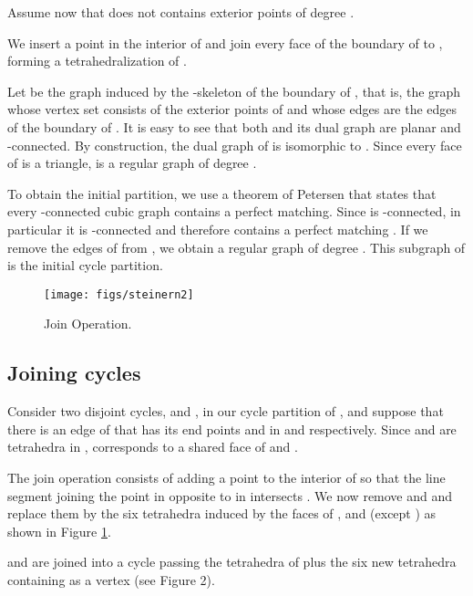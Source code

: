\documentclass{article}
\begin{document}
Assume now  that  does not contains 
exterior points of degree .\par

We insert a point  in the interior of  and join
every face of the boundary of  to , forming 
a tetrahedralization  of .\par

Let  be the graph induced by the -skeleton of 
the boundary of , that is, the graph whose vertex set
consists of the exterior points of  and whose edges are the edges
of the boundary of . It is easy to see that both  and its dual graph are planar 
and -connected.
By construction, the dual graph of  is isomorphic to 
. Since every face of  is a triangle, 
 is a regular graph of degree .\par

To obtain the initial partition, we use a theorem of
Petersen \cite{petersen} that states that every -connected
cubic graph contains a perfect matching. Since
 is -connected, in particular it is
 -connected and therefore contains a perfect matching . 
If we remove the edges of  from , we obtain
a regular graph of degree . This subgraph of 
is the initial cycle partition.\par

\begin{figure} \label{steinerfig}
  \begin{center}
    \texttt{[image: figs/steinern2]}
  \end{center}
    \caption{Join Operation.}
\end{figure}

\subsection{Joining cycles} \label{joincycles}


Consider two disjoint cycles,
 and , in our cycle partition of , and 
 suppose that there is an edge  of 
 that has its end points  and 
  in  and  
respectively. Since  and  are tetrahedra in
,  corresponds to a shared face  of 
 and .\par

The join operation consists of adding a point  to 
the interior of  so that the line segment
joining the point  in  opposite to  in 
intersects . We now remove   and
 and replace them by the six tetrahedra 
induced by the faces of  ,
 and  (except ) as shown in  Figure \ref{steinerfig}.

 and  are joined into a cycle passing the tetrahedra of 
 plus
the six new tetrahedra containing  as a vertex
(see Figure 2).\par
\end{document}
